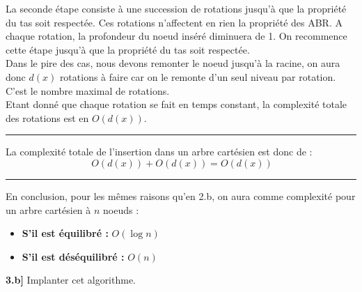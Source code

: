 \documentclass[a4paper,12pt]{report}
\begin{document}
\begin{tcolorbox}[colback=gray!10, colframe=blue!30, coltitle=black, title=Réponse à la 3.b - 2/2]

    La seconde étape consiste à une succession de rotations jusqu'à que la propriété du tas soit respectée. Ces rotations n'affectent en rien la propriété 
        des ABR. A chaque rotation, la profondeur du noeud inséré diminuera de 1. On recommence cette étape jusqu'à que la propriété du tas soit respectée.\\

    Dans le pire des cas, nous devons remonter le noeud jusqu'à la racine, on aura donc \( d(x) \) rotations à faire car on le remonte d'un seul niveau par 
        rotation. C'est le nombre maximal de rotations.\\

    Etant donné que chaque rotation se fait en temps constant, la complexité totale des rotations est en \( O(d(x)) \).\\[-0.4cm]

    \vspace{0.5cm}
    \hrule
    \vspace{0.5cm}

    La complexité totale de l'insertion dans un arbre cartésien est donc de :
    \[
    \ O(d(x)) + O(d(x)) = O(d(x))
    \]

    \vspace{0.5cm}
    \hrule
    \vspace{0.5cm}

    En conclusion, pour les mêmes raisons qu'en 2.b, on aura comme complexité pour un arbre cartésien à \( n \) noeuds :
    \begin{itemize}
        \item \textbf{S'il est équilibré :} \( O(\log n) \)
        \item \textbf{S'il est déséquilibré :} \( O(n) \)
    \end{itemize}

\end{tcolorbox}




\newpage
{}

\textbf{3.b]} Implanter cet algorithme.
\end{document}

